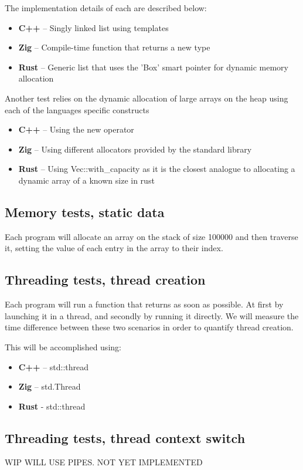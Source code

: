\documentclass{article}
\begin{document}
The implementation details of each are described below:
\begin{itemize}
    \item \textbf{C++} – Singly linked list using templates
    \item \textbf{Zig} – Compile-time function that returns a new type
    \item \textbf{Rust} – Generic list that uses the 'Box' smart pointer for dynamic memory allocation
\end{itemize}

Another test relies on the dynamic allocation of large arrays on the heap using each of the languages specific constructs
\begin{itemize}
    \item \textbf{C++} – Using the new operator
    \item \textbf{Zig} – Using different allocators provided by the standard library
    \item \textbf{Rust} – Using Vec::with\_capacity as it is the closest analogue to allocating a dynamic array of a known size in rust
\end{itemize}

\subsection{Memory tests, static data}

Each program will allocate an array on the stack of size 100000 and then traverse it, setting the value of each entry in the array to their index.

\subsection{Threading tests, thread creation}

Each program will run a function that returns as soon as possible. At first by launching it in a thread, and secondly by running it directly.
We will measure the time difference between these two scenarios in order to quantify thread creation.

This will be accomplished using:
\begin{itemize}
    \item \textbf{C++} – std::thread
    \item \textbf{Zig} – std.Thread
    \item \textbf{Rust} - std::thread
\end{itemize}

\subsection{Threading tests, thread context switch}
WIP
WILL USE PIPES. NOT YET IMPLEMENTED
\end{document}
